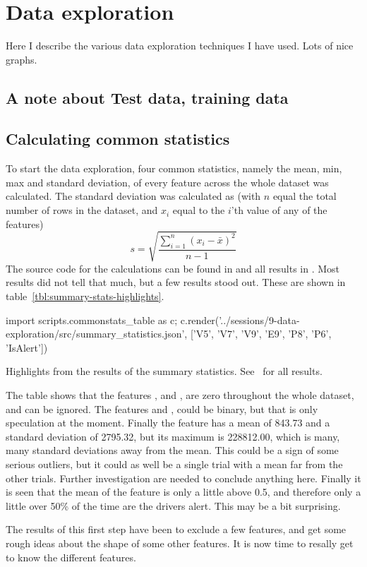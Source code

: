 \chapter{Data exploration}
Here I describe the various data exploration techniques I have used. Lots of nice graphs. 


\section{A note about Test data, training data}

\section{Calculating common statistics}\label{sec:summary-statistics}
To start the data exploration, four common statistics, namely the mean, min, max and standard deviation, of every feature across the whole dataset was calculated. The standard deviation was calculated as (with $n$ equal the total number of rows in the dataset, and $x_i$ equal to the $i$'th value of any of the features)
\[
    s = \sqrt{\frac{\sum_{i=1}^n (x_i-\bar{x})^2}{n-1}}
\]
The source code for the calculations can be found in  and all results in . Most results did not tell that much, but a few results stood out. These are shown in table~\ref{tbl:summary-stats-highlights}.
\begin{table}
    {\small\sffamily
        \begin{python}
            import scripts.commonstats_table as c; c.render('../sessions/9-data-exploration/src/summary_statistics.json', ['V5', 'V7', 'V9', 'E9', 'P8', 'P6', 'IsAlert'])
        \end{python}
    }
    \caption{Highlights from the results of the summary statistics. See~ for all results.}
    \label{tbl:summary-stats-highlights}
\end{table}
The table shows that the features ,  and , are zero throughout the whole dataset, and can be ignored. The features  and , could be binary, but that is only speculation at the moment. Finally the feature  has a mean of 843.73 and a standard deviation of 2795.32, but its maximum is 228812.00, which is many, many standard deviations away from the mean. This could be a sign of some serious outliers, but it could as well be a single trial with a mean far from the other trials. Further investigation are needed to conclude anything here. Finally it is seen that the mean of the  feature is only a little above 0.5, and therefore only a little over 50\% of the time are the drivers alert. This may be a bit surprising. \par
The results of this first step have been to exclude a few features, and get some rough ideas about the shape of some other features. It is now time to resally get to know the different features.

